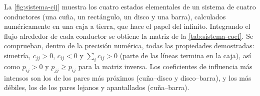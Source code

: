 \begin{observacion}\label{obs:numerico}
La \cref{fig:sistema-cij} muestra los cuatro estados elementales de un sistema de cuatro conductores (una cuña, un rectángulo, un disco y una barra),
calculados numéricamente en una caja a tierra, que hace el papel del infinito. Integrando el flujo alrededor de cada conductor se obtiene la matriz de
la \cref{tab:sistema-coef}. Se comprueban, dentro de la precisión numérica, todas las propiedades demostradas: simetría, $c_{jj}>0$, $c_{ij}<0$ y
$\sum_ic_{ij}>0$ (parte de las líneas termina en la caja), así como $p_{ij}>0$ y $p_{jj}\ge p_{ij}$ para la matriz inversa. Los coeficientes de influencia
más intensos son los de los pares más próximos (cuña--disco y disco--barra), y los más débiles, los de los pares lejanos y apantallados (cuña--barra).
\end{observacion}




